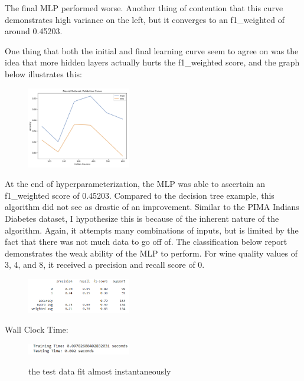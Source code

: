 \documentclass[conference]{IEEEtran}
\begin{document}
The final MLP performed worse. Another thing of contention that this curve demonstrates high variance on the left, but it converges to an f1\_weighted of around 0.45203. 

One thing that both the initial and final learning curve seem to agree on was the idea that more hidden layers actually hurts the f1\_weighted score, and the graph below illustrates this:

\begin{figure}[H]
    \centering
    \includegraphics[width=0.40\textwidth]{Red Wine Quality Graph Images/Neural Nets/nn vc final.png}
    \label{fig:enter-label}
\end{figure}

At the end of hyperparameterization, the MLP was able to ascertain an f1\_weighted score of 0.45203. Compared to the decision tree example, this algorithm did not see as drastic of an improvement. Similar to the PIMA Indians Diabetes dataset, I hypothesize this is because of the inherent nature of the algorithm. Again, it attempts many combinations of inputs, but is limited by the fact that there was not much data to go off of. The classification below report demonstrates the weak ability of the MLP to perform. For wine quality values of 3, 4, and 8, it received a precision and recall score of 0.

\begin{figure}[H]
    \centering
    \includegraphics[width=0.40\textwidth]{Red Wine Quality Graph Images/Neural Nets/nn cr.png}
    \label{fig:enter-label}
\end{figure}

Wall Clock Time: 
\begin{figure}[H]
    \centering
    \includegraphics[width=0.40\textwidth]{Red Wine Quality Graph Images/Neural Nets/nn wct.png}
    \label{fig:enter-label}
    \caption{the test data fit almost instantaneously}
\end{figure}
\end{document}
